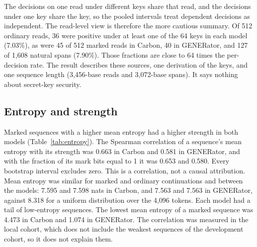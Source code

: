 \documentclass[10pt,twocolumn]{article}
\begin{document}
\begin{table}[tp]
\centering
\caption{Calibration of the sequence-level decision under 64 keys never used in generation, in the
local cohort. \textit{Positive / decisions} counts decisions with a corrected $P$-value of at most
0.01 (512 reads times 64 keys for model output, 1{,}608 spans times 64 keys for natural spans).
\textit{Per-key rate} is the range of the positive rate over keys. The last column counts reads
positive under at least one key. The decisions share reads and keys, so the counts are not
independent. Supplementary Table~\ref{tab:calibration} gives the fractions at five nominal levels.}
\label{tab:null}
\small
\setlength{\tabcolsep}{4pt}
\renewcommand{\arraystretch}{1.08}

\end{table}

The decisions on one read under different keys share that read, and the decisions under one key
share the key, so the pooled intervals treat dependent decisions as independent. The read-level view
is therefore the more cautious summary. Of 512 ordinary reads, 36 were positive under at least one
of the 64 keys in each model (7.03\%), as were 45 of 512 marked reads in Carbon, 40 in GENERator,
and 127 of 1{,}608 natural spans (7.90\%). Those fractions are close to 64 times the per-decision
rate. The result describes these sources, one derivation of the keys, and one sequence length (3{,}456-base
reads and 3{,}072-base spans). It says nothing about secret-key security.

\subsection{Entropy and strength}
\label{sec:entropy}

Marked sequences with a higher mean entropy had a higher strength in both models
(Table~\ref{tab:entropy}). The Spearman correlation of a sequence's mean entropy with its strength
was 0.663 in Carbon and 0.581 in GENERator, and with the fraction of its mark bits equal to 1 it was
0.653 and 0.580. Every bootstrap interval excludes zero. This is
a correlation, not a causal attribution. Mean entropy was similar for marked and ordinary
continuations and between the models: 7.595 and 7.598 nats in Carbon, and 7.563 and 7.563 in
GENERator, against 8.318 for a uniform distribution over the 4{,}096 tokens. Each model had a tail of
low-entropy sequences. The lowest mean entropy of a marked sequence was 4.473 in Carbon and 1.074 in
GENERator. The correlation was measured in the local cohort, which does not include the weakest
sequences of the development cohort, so it does not explain them.
\end{document}
